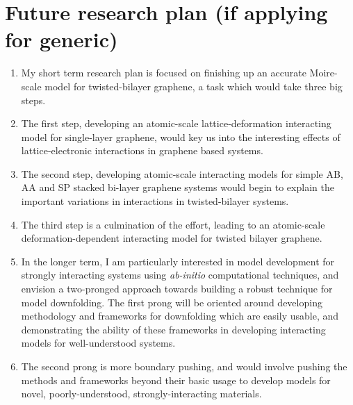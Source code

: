 \documentclass{article}
\begin{document}
\section{Future research plan (if applying for generic)}
\begin{enumerate}
\item My short term research plan is focused on finishing up an accurate Moire-scale model for twisted-bilayer graphene, a task which would take three big steps.

\item The first step, developing an atomic-scale lattice-deformation interacting model for single-layer graphene, would key us into the interesting effects of lattice-electronic interactions in graphene based systems.

\item The second step, developing atomic-scale interacting models for simple AB, AA and SP stacked bi-layer graphene systems would begin to explain the important variations in interactions in twisted-bilayer systems.

\item The third step is a culmination of the effort, leading to an atomic-scale deformation-dependent interacting model for twisted bilayer graphene.

\item In the longer term, I am particularly interested in model development for strongly interacting systems using \textit{ab-initio} computational techniques, and envision a two-pronged approach towards building a robust technique for model downfolding. 
The first prong will be oriented around developing methodology and frameworks for downfolding which are easily usable, and demonstrating the ability of these frameworks in developing interacting models for well-understood systems.

\item The second prong is more boundary pushing, and would involve pushing the methods and frameworks beyond their basic usage to develop models for novel, poorly-understood, strongly-interacting materials.
\end{enumerate} 
\end{document}
